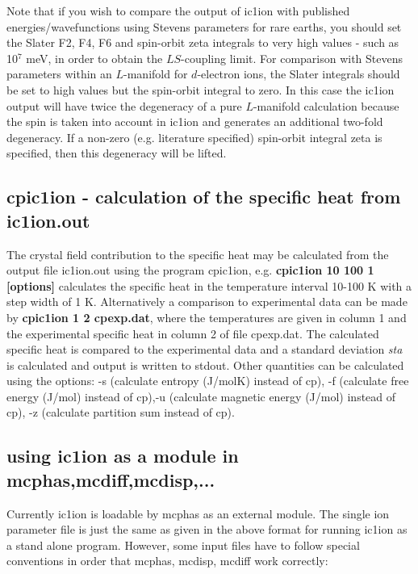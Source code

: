 Note that if you wish to compare the output of {\prg ic1ion} with published energies/wavefunctions using Stevens
parameters for rare earths, you should set the Slater {\prg F2, F4, F6} and spin-orbit {\prg zeta} integrals to
very high values - such as 10$^7$ meV, in order to obtain the $LS$-coupling limit. For comparison with Stevens
parameters within an $L$-manifold for $d$-electron ions, the Slater integrals should be set to high
values but the spin-orbit integral to zero. In this case the {\prg ic1ion} output will have twice the
degeneracy of a pure $L$-manifold calculation because the spin is taken into account in {\prg ic1ion} and
generates an additional two-fold degeneracy. If a non-zero (e.g. literature specified) spin-orbit integral
{\prg zeta} is specified, then this degeneracy will be lifted.

\subsection{{\prg cpic1ion} - calculation of the specific heat from {\prg ic1ion.out}}
 The crystal field contribution to the specific heat may be calculated 
from the output file {\prg ic1ion.out} using the  program {\prg cpic1ion}, e.g. {\bf cpic1ion 10 100 1 [options]}
calculates the specific heat in the temperature interval 10-100 K with a step width
of 1 K. Alternatively a comparison to experimental data can be made by {\bf cpic1ion 1 2 cpexp.dat},
where the temperatures are given in column 1 and the experimental specific heat in column
2 of file cpexp.dat. The calculated specific heat is compared to the experimental data and
a standard deviation {\em sta} is calculated and output is written to stdout.
Other quantities can be calculated using the options: -s  (calculate entropy  (J/molK) instead of cp),
-f (calculate free energy (J/mol) instead of cp),-u  (calculate magnetic energy (J/mol) instead of cp),
-z (calculate partition sum instead of cp).


\subsection{using {\prg ic1ion} as a module in {\prg mcphas},{\prg mcdiff},{\prg mcdisp},...}

Currently {\prg ic1ion} is loadable by mcphas as an external module. The single
ion parameter file is just the same as given in the above format for running {\prg ic1ion} as 
a stand alone program. However, some input files have to follow special conventions in order that 
{\prg mcphas, mcdisp, mcdiff} work correctly: 

